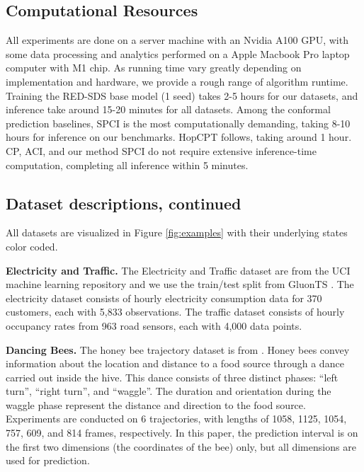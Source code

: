 \subsection{Computational Resources}

All experiments are done on a server machine with an Nvidia A100 GPU, with some data processing and analytics performed on a Apple Macbook Pro laptop computer with M1 chip. As running time vary greatly depending on implementation and hardware, we provide a rough range of algorithm runtime. Training the RED-SDS base model (1 seed) takes 2-5 hours for our datasets, and inference take around 15-20 minutes for all datasets. Among the conformal prediction baselines, SPCI is the most computationally demanding, taking 8-10 hours for inference on our benchmarks. HopCPT follows, taking around 1 hour. CP, ACI, and our method SPCI do not require extensive inference-time computation, completing all inference within 5 minutes. 

\subsection{Dataset descriptions, continued}

All datasets are visualized in Figure \ref{fig:examples} with their underlying states color coded.

\textbf{Electricity and Traffic.} The Electricity and Traffic dataset are from the UCI machine learning repository \cite{Dua2017UCI} and we use the train/test split from GluonTS \cite{alexandrov2020gluonts}. The electricity dataset consists of hourly electricity consumption data for 370 customers, each with 5,833 observations. The traffic dataset consists of hourly occupancy rates from 963 road sensors, each with 4,000 data points.

\textbf{Dancing Bees.} The honey bee trajectory dataset is from \citep{oh2008learning}. Honey bees convey information about the location and distance to a food source through a dance carried out inside the hive. This dance consists of three distinct phases: “left turn”, “right turn”, and “waggle”. The duration and orientation during the waggle phase represent the distance and direction to the food source. Experiments are conducted on 6 trajectories, with lengths of 1058, 1125, 1054, 757, 609, and 814 frames, respectively. In this paper, the prediction interval is on the first two dimensions (the coordinates of the bee) only, but all dimensions are used for prediction. %


